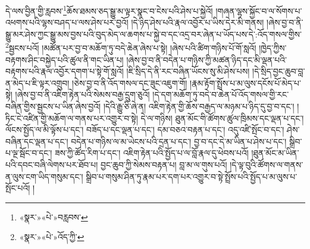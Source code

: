 དེ་ལས་བྱིན་གྱི་རླབས་\footnote{«སྣར་»«པེ་»བརླབས་}ཆོས་ཐམས་ཅད་སྒྱུ་མ་ལྟར་སྣང་བ་ངེས་པའི་ཤེས་པ་སྐྱེའོ། །གཞན་ལྷས་སྐྱོང་བ་ལ་སོགས་པ་འཕགས་པའི་ལྷས་བཤད་པ་ལས་ཤེས་པར་བྱའོ། །དེ་ཉིད་ཤེས་པའི་རྣལ་འབྱོར་པ་ཡིས་དེར་མི་གནས། །ཞེས་བྱ་བ་ནི་སྒྱུ་མར་ཤེས་ཀྱང་སྒྱུ་མས་བྱས་པའི་བུད་མེད་ལ་ཆགས་པ་སྐྱེ་བ་དང་འདྲ་བར་ཞེན་པ་ཡོད་པས་དེ་:འོད་གསལ་གྱིས་\footnote{«སྣར་»«པེ་»འོད་ཀྱི་}སྦྱངས་པའོ། །མཚོན་པར་བྱ་བ་མཆོག་ཏུ་བདེ་ཆེན་ཞེས་པ་སྟེ། །ཞེས་པའི་ཚིག་གཉིས་པོ་གོ་སླའོ། །ཁྱེད་ཀྱིས་བརྟགས་ཤིང་བསྐྱེད་པའི་ཚུལ་ནི་གང་ཡིན་པ། །ཞེས་བྱ་བ་ནི་བདེན་པ་གཉིས་ཀྱི་མཚན་ཉིད་དང་མི་ལྡན་པའི་བརྟགས་པའི་རྣལ་འབྱོར་དགག་པ་སྟེ་གོ་སླའོ། །ཇི་སྲིད་དེ་ནི་རང་བཞིན་ཡོངས་སུ་མི་ཤེས་པས། །དེ་སྲིད་བྱང་ཆུབ་བླ་ན་མེད་པ་ཇི་ལྟར་འགྲུབ། །ཅེས་བྱ་བ་ནི་འོད་གསལ་དང་ཟུང་འཇུག་གོ། །རྣམ་རྟོག་སྤྲོས་པ་མ་ལུས་དངོས་པོ་མེད་པ་སྟེ། །ཞེས་བྱ་བ་ནི་འཇིག་རྟེན་པའི་སེམས་བརྒྱ་དྲུག་ཅུའོ། །དེ་དག་མཆོག་ཏུ་བདེ་བ་ཆེན་པོ་འོད་གསལ་གྱི་རང་བཞིན་གྱིས་སྦྱངས་པ་ཡིན་ཞེས་བྱའོ། །དེའི་རྒྱུ་ཅི་ཞེ་ན། འཇིག་རྟེན་གྱི་ཆོས་བརྒྱད་ལ་མཉམ་པ་ཉིད་དུ་བྱ་བ་དང་། །ཏིང་ངེ་འཛིན་གྱི་མཆོག་ལ་གནས་པར་འགྱུར་བ་སྟེ། དེ་ལ་གཉིས། ཐུན་མོང་གི་ཚོགས་ཚུལ་ཁྲིམས་དང་ལྡན་པ་དང་། ལོངས་སྤྱོད་ལ་མི་ལྟོས་པ་དང་། བཟོད་པ་དང་ལྡན་པ་དང་། དམ་བཅའ་བརྟན་པ་དང་། འདུ་འཛི་སྤོང་བ་དང་། ཤེས་བཞིན་དང་ལྡན་པ་དང་། བདེན་པ་གཉིས་ལ་མ་ཡེངས་པའི་དྲན་པ་དང་། བྱ་བ་དང་དེ་མ་ཡིན་པ་ཤེས་པ་དང་། སྒྲིབ་པ་ལྔ་སྦོང་བ་དང་། ཟས་ཀྱི་ཚོད་རིག་པ་དང་། འཇིག་རྟེན་པའི་སྤྱོད་པ་ལ་བློ་རྣལ་དུ་ཕེབས་པའོ། །ཐུན་མོང་མ་ཡིན་པའི་དབང་བཞི་ལེགས་པར་ཐོབ་པ། བྱང་ཆུབ་ཀྱི་སེམས་བརྟན་པ། བླ་མ་ལ་གུས་པའོ། །དེ་ལྟ་བུའི་ཚོགས་ལ་གནས་ན་ལུས་ངག་ཡིད་གསུམ་དང་། སྒྲིབ་པ་གསུམ་ཤིན་ཏུ་རྣམ་པར་དག་པར་འགྱུར་བ་སྟེ་སྤྲོས་པའི་སྤྱོད་པ་མ་ལུས་པ་སྤོང་པའོ། །
